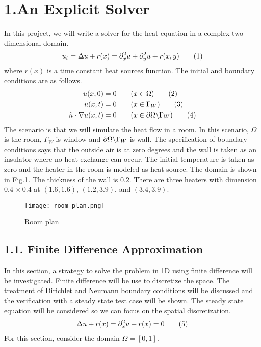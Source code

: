 \documentclass[11pt, letterpaper, hidelinks]{article}
\theoremstyle{definition}
\newcommand\numberthis{\addtocounter{equation}{1}\tag{\theequation}}
\newcommand{\x}{\, \times}
\newcommand\bslash{\char`\\}
\begin{document}
\section{1.An Explicit Solver}
In this project, we will write a solver for the heat equation in a complex two dimensional domain.
\begin{align*}
    u_t = \Delta u + r(x) = \partial_x^2 u + \partial_y^2 u + r(x,y)   \numberthis \label{heat_eq}
\end{align*}
where $r(x)$ is a time constant heat sources function. The initial and boundary conditions are as follows.
\begin{align*}
    u(x,0)                    & = 0 \qquad  					(x \in \Omega) 			\numberthis \label{ic}                     \\
    u(x,t)                    & = 0 \qquad  					(x \in \Gamma_W) 		\numberthis \label{bc1}                   \\
    \hat{n}\cdot\nabla u(x,t) & = 0 \qquad  	(x \in \partial\Omega \bslash \Gamma_W)		\numberthis \label{bc2}
\end{align*}
The scenario is that we will simulate the heat flow in a room. In this scenario, $\Omega$ is the room, $\Gamma_W$ is window and $\partial\Omega \bslash \Gamma_W$ is wall. The specification of boundary conditions says that the outside air is at zero degrees and the wall is taken as an insulator where no heat exchange can occur. The initial temperature is taken as zero and the heater in the room is modeled as heat source. The domain is shown in Fig.\ref{fig:room_plan}. The thickness of the wall is $0.2$. There are three heaters with dimension $0.4 \x 0.4$ at $(1.6,1.6)$, $(1.2,3.9)$, and $(3.4,3.9)$.
\begin{figure}[H]
    \texttt{[image: room\_plan.png]}
    \centering
    \caption{Room plan}
    \label{fig:room_plan}
\end{figure}

\subsection{1.1. Finite Difference Approximation}

In this section, a strategy to solve the problem in 1D using finite difference will be investigated. Finite difference will be use to discretize the space. The treatment of Dirichlet and Neumann boundary conditions will be discussed and the verification with a steady state test case will be shown. The steady state equation will be considered so we can focus on the spatial discretization.
\begin{align*}
    \Delta u + r(x) = \partial_x^2 u + r(x) = 0  \numberthis \label{heat_steady}
\end{align*}
For this section, consider the domain $\Omega = \left[ 0,1 \right]$.
\end{document}
